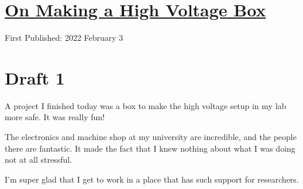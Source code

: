 \documentclass[12pt]{article}[titlepage]
\renewcommand{\,}{\textsuperscript{,}}
\begin{document}
\doublespacing
\section{\href{making-a-box.html}{On Making a High Voltage Box}}
First Published: 2022 February 3

\section{Draft 1}
A project I finished today was a box to make the high voltage setup in my lab more safe.
It was really fun!

The electronics and machine shop at my university are incredible, and the people there are fantastic.
It made the fact that I knew nothing about what I was doing not at all stressful.

I'm super glad that I get to work in a place that has such support for researchers.
\end{document}
